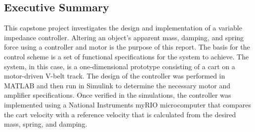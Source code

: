 \subsection*{Executive Summary}

This capstone project investigates the design and implementation of a variable impedance controller. Altering an object's apparent mass, damping, and spring force using a controller and motor is the purpose of this report. The basis for the control scheme is a set of functional specifications for the system to achieve. The system, in this case, is a one-dimensional prototype consisting of a cart on a motor-driven V-belt track. The design of the controller was performed in MATLAB and then run in Simulink to determine the necessary motor and amplifier specifications. Once verified in the simulations, the controller was implemented using a National Instruments myRIO microcomputer that compares the cart velocity with a reference velocity that is calculated from the desired mass, spring, and damping.  